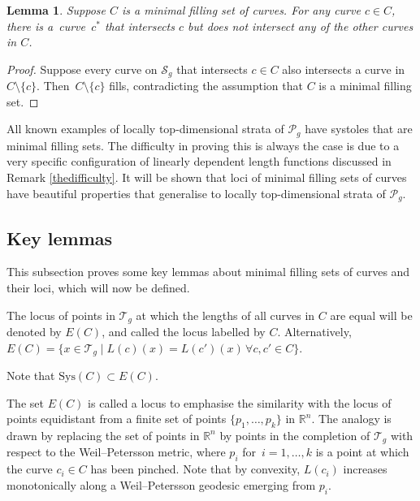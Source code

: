 \documentclass[11pt]{article}
\numberwithin{equation}{section}
\numberwithin{equation}{section}
\newtheorem{Lemma}[Theorem]{Lemma}
\begin{document}
\begin{Lemma}
Suppose $C$ is a minimal filling set of curves. For any curve $c\in C$, there is a~curve~$c^{*}$ that intersects $c$ but does not intersect any of the other curves in $C$.
\end{Lemma}
\begin{proof}
Suppose every curve on $\mathcal{S}_{g}$ that intersects $c\in C$ also intersects a curve in $C\setminus \{c\}$. Then~${C\setminus \{c\}}$ fills, contradicting the assumption that $C$ is a minimal filling set.
\end{proof}

All known examples of locally top-dimensional strata of $\mathcal{P}_{g}$ have systoles that are minimal filling sets. The difficulty in proving this is always the case is due to a very specific configuration of linearly dependent length functions discussed in Remark \ref{thedifficulty}. It will be shown that loci of minimal filling sets of curves have beautiful properties that generalise to locally top-dimensional strata of $\mathcal{P}_{g}$.

\subsection{Key lemmas}
This subsection proves some key lemmas about minimal filling sets of curves and their loci, which will now be defined.

\begin{Definition}
The locus of points in $\mathcal{T}_{g}$ at which the lengths of all curves in $C$ are equal will be denoted by $E(C)$, and called the locus labelled by $C$. Alternatively,
$E(C)=\{x\in \mathcal{T}_{g} \mid L(c)(x)=L(c')(x) \, \forall c,c'\in C\}$.
\end{Definition}
Note that $\mathrm{Sys}(C)\subset E(C)$.

The set $E(C)$ is called a locus to emphasise the similarity with the locus of points equidistant from a finite set of points $\{p_{1}, \dots, p_{k}\}$ in $\mathbb{R}^{n}$. The analogy is drawn by replacing the set of points in $\mathbb{R}^{n}$ by points in the completion of $\mathcal{T}_{g}$ with respect to the Weil--Petersson metric, where $p_{i}$ for~${i=1, \dots, k}$ is a point at which the curve $c_{i}\in C$ has been pinched. Note that by convexity, $L(c_{i})$ increases monotonically along a Weil--Petersson geodesic emerging from $p_i$.
\end{document}

